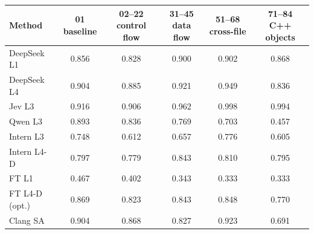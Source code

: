 \begin{tabular}{@{}lccccc@{}}
\toprule
Method & 01 baseline & 02–22 control flow & 31–45 data flow & 51–68 cross-file & 71–84 C++ objects \\
\midrule
DeepSeek L1 & 0.856 & 0.828 & 0.900 & 0.902 & 0.868 \\
DeepSeek L4 & 0.904 & 0.885 & 0.921 & 0.949 & 0.836 \\
Jev L3 & 0.916 & 0.906 & 0.962 & 0.998 & 0.994 \\
Qwen L3 & 0.893 & 0.836 & 0.769 & 0.703 & 0.457 \\
Intern L3 & 0.748 & 0.612 & 0.657 & 0.776 & 0.605 \\
Intern L4-D & 0.797 & 0.779 & 0.843 & 0.810 & 0.795 \\
FT L1 & 0.467 & 0.402 & 0.343 & 0.333 & 0.333 \\
FT L4-D (opt.) & 0.869 & 0.823 & 0.843 & 0.848 & 0.770 \\
Clang SA & 0.904 & 0.868 & 0.827 & 0.923 & 0.691 \\
\bottomrule
\end{tabular}
